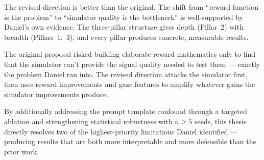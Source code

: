 \documentclass[11pt,a4paper]{article}
\begin{document}
The revised direction is better than the original. The shift from ``reward function is the problem'' to ``simulator quality is the bottleneck'' is well-supported by Daniel's own evidence. The three-pillar structure gives depth (Pillar~2) with breadth (Pillars~1,~3), and every pillar produces concrete, measurable results.

The original proposal risked building elaborate reward mathematics only to find that the simulator can't provide the signal quality needed to test them --- exactly the problem Daniel ran into. The revised direction attacks the simulator first, then uses reward improvements and gaze features to amplify whatever gains the simulator improvements produce.

By additionally addressing the prompt template confound through a targeted ablation and strengthening statistical robustness with $n \geq 5$ seeds, this thesis directly resolves two of the highest-priority limitations Daniel identified --- producing results that are both more interpretable and more defensible than the prior work.
\end{document}
